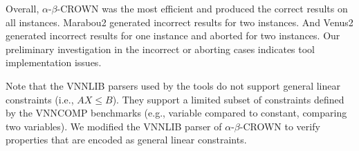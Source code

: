 Overall, $\alpha$-$\beta$-CROWN was the most efficient and produced the correct results on all instances. Marabou2 generated incorrect results for two instances. And Venus2 generated incorrect results for one instance and aborted for two instances. Our preliminary investigation in the incorrect or aborting cases indicates tool implementation issues.

Note that the VNNLIB parsers used by the tools do not support general linear constraints (i.e., $AX\le B$). They support a limited subset of constraints defined by the VNNCOMP benchmarks (e.g., variable compared to constant, comparing two variables). We modified the VNNLIB parser of $\alpha$-$\beta$-CROWN to verify properties that are encoded as general linear constraints. 




